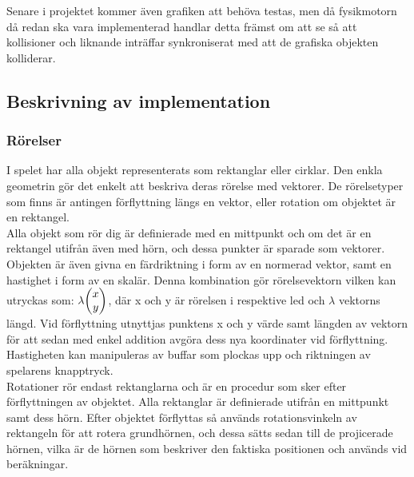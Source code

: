 \documentclass[12pt,a4paper]{article}
\newcounter{subsubsubsection}[subsubsection]
\begin{document}
Senare i projektet kommer även grafiken att behöva testas, men då fysikmotorn då redan ska vara implementerad handlar detta främst om att se så att kollisioner och liknande inträffar synkroniserat med att de grafiska objekten kolliderar. \\

\subsection{Beskrivning av implementation}


\subsubsection{Rörelser}
I spelet har alla objekt representerats som rektanglar eller cirklar. Den enkla geometrin gör det enkelt att beskriva deras rörelse med vektorer. De rörelsetyper som finns är antingen förflyttning längs en vektor, eller rotation om objektet är en rektangel. \\

Alla objekt som rör dig är definierade med en mittpunkt och om det är en rektangel utifrån även med hörn, och dessa punkter är sparade som vektorer. Objekten är även givna en färdriktning i form av en normerad vektor, samt en hastighet i form av en skalär. Denna kombination gör rörelsevektorn vilken kan utryckas som: 
\begin{math}
$$\lambda$$
	\begin{pmatrix}
		x \\
		y
	\end{pmatrix}
\end{math}, där x och y är rörelsen i respektive led och $\lambda$ vektorns längd. Vid förflyttning utnyttjas punktens x och y värde samt längden av vektorn för att sedan med enkel addition avgöra dess nya koordinater vid förflyttning. Hastigheten kan manipuleras av buffar som plockas upp och riktningen av spelarens knapptryck. \\

Rotationer rör endast rektanglarna och är en procedur som sker efter förflyttningen av objektet. Alla rektanglar är definierade utifrån en mittpunkt samt dess hörn. Efter objektet förflyttas så används rotationsvinkeln av rektangeln för att rotera grundhörnen, och dessa sätts sedan till de projicerade hörnen, vilka är de hörnen som beskriver den faktiska positionen och används vid beräkningar. \\
\end{document}
